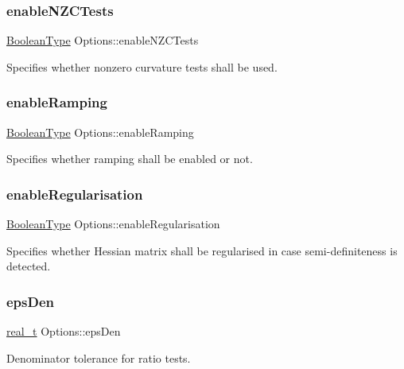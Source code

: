 \subsubsection{\texorpdfstring{enable\+N\+Z\+C\+Tests}{enableNZCTests}}
{\footnotesize\ttfamily \hyperlink{_types_8hpp_a20f82124c82b6f5686a7fce454ef9089}{Boolean\+Type} Options\+::enable\+N\+Z\+C\+Tests}

Specifies whether nonzero curvature tests shall be used. \mbox{\label{class_options_a8346f6e9a849cc3da7cbbede72a10196}} 
\subsubsection{\texorpdfstring{enable\+Ramping}{enableRamping}}
{\footnotesize\ttfamily \hyperlink{_types_8hpp_a20f82124c82b6f5686a7fce454ef9089}{Boolean\+Type} Options\+::enable\+Ramping}

Specifies whether ramping shall be enabled or not. \mbox{\label{class_options_adebe0981cee6bd30e7f242fa16efddb7}} 
\subsubsection{\texorpdfstring{enable\+Regularisation}{enableRegularisation}}
{\footnotesize\ttfamily \hyperlink{_types_8hpp_a20f82124c82b6f5686a7fce454ef9089}{Boolean\+Type} Options\+::enable\+Regularisation}

Specifies whether Hessian matrix shall be regularised in case semi-\/definiteness is detected. \mbox{\label{class_options_a982819ac9663847af5c920416192de1b}} 
\subsubsection{\texorpdfstring{eps\+Den}{epsDen}}
{\footnotesize\ttfamily \hyperlink{qp_o_a_s_e_s__wrapper_8h_a0d00e2b3dfadee81331bbb39068570c4}{real\+\_\+t} Options\+::eps\+Den}

Denominator tolerance for ratio tests. \mbox{\label{class_options_aadb15470a12af09f0146a8b24e1a26fd}} 
